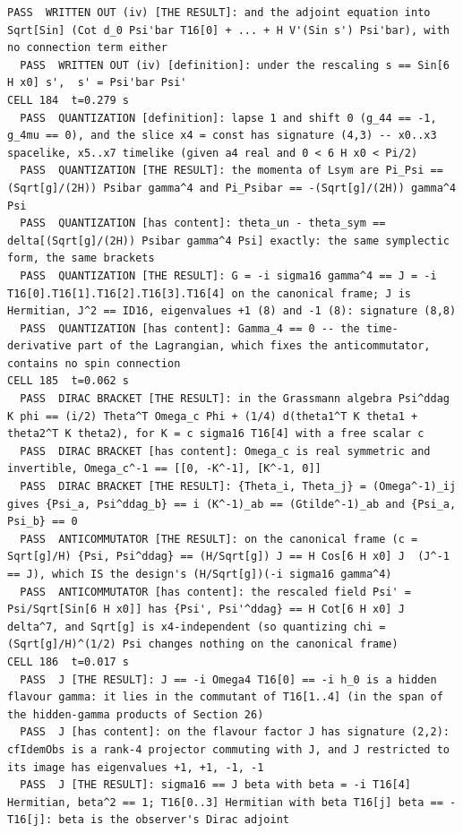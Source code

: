 \begin{Verbatim}[fontsize=\scriptsize]
  PASS  WRITTEN OUT (iv) [THE RESULT]: and the adjoint equation into Sqrt[Sin] (Cot d_0 Psi'bar T16[0] + ... + H V'(Sin s') Psi'bar), with no connection term either
  PASS  WRITTEN OUT (iv) [definition]: under the rescaling s == Sin[6 H x0] s',  s' = Psi'bar Psi'
CELL 184  t=0.279 s
  PASS  QUANTIZATION [definition]: lapse 1 and shift 0 (g_44 == -1, g_4mu == 0), and the slice x4 = const has signature (4,3) -- x0..x3 spacelike, x5..x7 timelike (given a4 real and 0 < 6 H x0 < Pi/2)
  PASS  QUANTIZATION [THE RESULT]: the momenta of Lsym are Pi_Psi == (Sqrt[g]/(2H)) Psibar gamma^4 and Pi_Psibar == -(Sqrt[g]/(2H)) gamma^4 Psi
  PASS  QUANTIZATION [has content]: theta_un - theta_sym == delta[(Sqrt[g]/(2H)) Psibar gamma^4 Psi] exactly: the same symplectic form, the same brackets
  PASS  QUANTIZATION [THE RESULT]: G = -i sigma16 gamma^4 == J = -i T16[0].T16[1].T16[2].T16[3].T16[4] on the canonical frame; J is Hermitian, J^2 == ID16, eigenvalues +1 (8) and -1 (8): signature (8,8)
  PASS  QUANTIZATION [has content]: Gamma_4 == 0 -- the time-derivative part of the Lagrangian, which fixes the anticommutator, contains no spin connection
CELL 185  t=0.062 s
  PASS  DIRAC BRACKET [THE RESULT]: in the Grassmann algebra Psi^ddag K phi == (i/2) Theta^T Omega_c Phi + (1/4) d(theta1^T K theta1 + theta2^T K theta2), for K = c sigma16 T16[4] with a free scalar c
  PASS  DIRAC BRACKET [has content]: Omega_c is real symmetric and invertible, Omega_c^-1 == [[0, -K^-1], [K^-1, 0]]
  PASS  DIRAC BRACKET [THE RESULT]: {Theta_i, Theta_j} = (Omega^-1)_ij gives {Psi_a, Psi^ddag_b} == i (K^-1)_ab == (Gtilde^-1)_ab and {Psi_a, Psi_b} == 0
  PASS  ANTICOMMUTATOR [THE RESULT]: on the canonical frame (c = Sqrt[g]/H) {Psi, Psi^ddag} == (H/Sqrt[g]) J == H Cos[6 H x0] J  (J^-1 == J), which IS the design's (H/Sqrt[g])(-i sigma16 gamma^4)
  PASS  ANTICOMMUTATOR [has content]: the rescaled field Psi' = Psi/Sqrt[Sin[6 H x0]] has {Psi', Psi'^ddag} == H Cot[6 H x0] J delta^7, and Sqrt[g] is x4-independent (so quantizing chi = (Sqrt[g]/H)^(1/2) Psi changes nothing on the canonical frame)
CELL 186  t=0.017 s
  PASS  J [THE RESULT]: J == -i Omega4 T16[0] == -i h_0 is a hidden flavour gamma: it lies in the commutant of T16[1..4] (in the span of the hidden-gamma products of Section 26)
  PASS  J [has content]: on the flavour factor J has signature (2,2): cfIdemObs is a rank-4 projector commuting with J, and J restricted to its image has eigenvalues +1, +1, -1, -1
  PASS  J [THE RESULT]: sigma16 == J beta with beta = -i T16[4] Hermitian, beta^2 == 1; T16[0..3] Hermitian with beta T16[j] beta == -T16[j]: beta is the observer's Dirac adjoint

\end{Verbatim}
